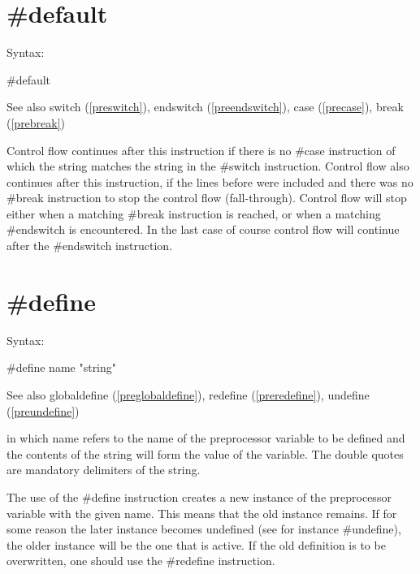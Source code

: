 
\section{\#default}
\label{predefault}

\noindent Syntax:

\#default
 
\noindent See also switch (\ref{preswitch}),
        endswitch (\ref{preendswitch}),
        case (\ref{precase}),
        break (\ref{prebreak})

\noindent Control flow continues after this instruction if 
there is no \#case instruction of which the string matches 
the string in the \#switch instruction. Control flow also 
continues after this instruction, if the lines before were included and 
there was no \#break instruction to stop the control flow 
(fall-through). Control flow will stop either when a matching \#break 
instruction is reached, or when a matching \#endswitch 
is encountered. In the last case of course control flow will continue after 
the \#endswitch instruction.


\section{\#define}
\label{predefine}

\noindent Syntax:

\#define name "string"
 
\noindent See also globaldefine (\ref{preglobaldefine}), 
           redefine (\ref{preredefine}), 
           undefine (\ref{preundefine})

\noindent in which name refers to the name of the 
preprocessor 
variable to be defined and the contents of the 
string will form the value of the variable. The double quotes are mandatory 
delimiters of the string.

The use of the \#define instruction creates a new instance 
of the preprocessor variable with the given name. This means that the old 
instance remains. If for some reason the later instance 
becomes undefined (see for instance \#undefine), the older instance will be 
the one that is active. If the old definition is to be overwritten, one 
should use the \#redefine instruction.

